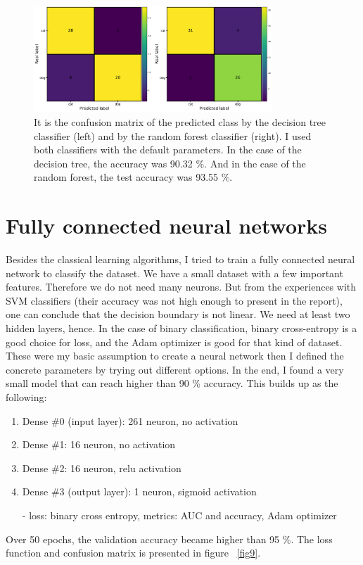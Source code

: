 \documentclass[12pt a4paper]{article}
\numberwithin{equation}{section}
\begin{document}
\begin{figure}[H]
\centering
\includegraphics[width=0.8\textwidth]{fig/conf1.pdf}
\caption{It is the confusion matrix of the predicted class by the decision tree classifier (left) and by the random forest classifier (right). I used both classifiers with the default parameters.   In the case of the decision tree, the accuracy was 90.32 \%. And in the case of the random forest, the test accuracy was 93.55 \%.}
\label{fig8}
\end{figure}

\section{Fully connected neural networks}

Besides the classical learning algorithms, I tried to train a fully connected neural network to classify the dataset. We have a small dataset with a few important features. Therefore we do not need many neurons.  But from the experiences with SVM classifiers (their accuracy was not high enough to present in the report), one can conclude that the decision boundary is not linear.  We need at least two hidden layers, hence. In the case of binary classification, binary cross-entropy is a good choice for loss, and the Adam optimizer is good for that kind of dataset. These were my basic assumption to create a neural network then I defined the concrete parameters by trying out different options. In the end, I found a very small model that can reach higher than 90 \% accuracy.  This builds up as the following:
\begin{enumerate}
\item Dense \#0 (input layer): 261 neuron, no activation
\item Dense \#1: 16 neuron, no activation
\item Dense \#2: 16 neuron, relu activation
\item Dense \#3 (output layer): 1 neuron, sigmoid activation
\item[-]  loss: binary cross entropy, metrics: AUC and accuracy, Adam optimizer
\end{enumerate}
Over 50 epochs, the validation accuracy became higher than 95 \%. The loss function and confusion matrix is presented in figure ~\ref{fig9}.
\end{document}
